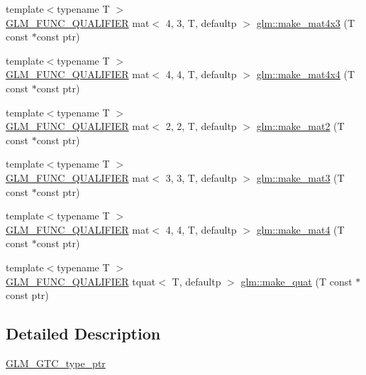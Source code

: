 \begin{DoxyCompactItemize}
\item 
{\footnotesize template$<$typename T $>$ }\\\mbox{\hyperlink{setup_8hpp_a33fdea6f91c5f834105f7415e2a64407}{G\+L\+M\+\_\+\+F\+U\+N\+C\+\_\+\+Q\+U\+A\+L\+I\+F\+I\+ER}} mat$<$ 4, 3, T, defaultp $>$ \mbox{\hyperlink{group__gtc__type__ptr_ga0330bf6640092d7985fac92927bbd42b}{glm\+::make\+\_\+mat4x3}} (T const $\ast$const ptr)
\item 
{\footnotesize template$<$typename T $>$ }\\\mbox{\hyperlink{setup_8hpp_a33fdea6f91c5f834105f7415e2a64407}{G\+L\+M\+\_\+\+F\+U\+N\+C\+\_\+\+Q\+U\+A\+L\+I\+F\+I\+ER}} mat$<$ 4, 4, T, defaultp $>$ \mbox{\hyperlink{group__gtc__type__ptr_ga8f084be30e404844bfbb4a551ac2728c}{glm\+::make\+\_\+mat4x4}} (T const $\ast$const ptr)
\item 
{\footnotesize template$<$typename T $>$ }\\\mbox{\hyperlink{setup_8hpp_a33fdea6f91c5f834105f7415e2a64407}{G\+L\+M\+\_\+\+F\+U\+N\+C\+\_\+\+Q\+U\+A\+L\+I\+F\+I\+ER}} mat$<$ 2, 2, T, defaultp $>$ \mbox{\hyperlink{group__gtc__type__ptr_ga04409e74dc3da251d2501acf5b4b546c}{glm\+::make\+\_\+mat2}} (T const $\ast$const ptr)
\item 
{\footnotesize template$<$typename T $>$ }\\\mbox{\hyperlink{setup_8hpp_a33fdea6f91c5f834105f7415e2a64407}{G\+L\+M\+\_\+\+F\+U\+N\+C\+\_\+\+Q\+U\+A\+L\+I\+F\+I\+ER}} mat$<$ 3, 3, T, defaultp $>$ \mbox{\hyperlink{group__gtc__type__ptr_ga611ee7c4d4cadfc83a8fa8e1d10a170f}{glm\+::make\+\_\+mat3}} (T const $\ast$const ptr)
\item 
{\footnotesize template$<$typename T $>$ }\\\mbox{\hyperlink{setup_8hpp_a33fdea6f91c5f834105f7415e2a64407}{G\+L\+M\+\_\+\+F\+U\+N\+C\+\_\+\+Q\+U\+A\+L\+I\+F\+I\+ER}} mat$<$ 4, 4, T, defaultp $>$ \mbox{\hyperlink{group__gtc__type__ptr_gae7bcedb710d1446c87fd1fc93ed8ee9a}{glm\+::make\+\_\+mat4}} (T const $\ast$const ptr)
\item 
{\footnotesize template$<$typename T $>$ }\\\mbox{\hyperlink{setup_8hpp_a33fdea6f91c5f834105f7415e2a64407}{G\+L\+M\+\_\+\+F\+U\+N\+C\+\_\+\+Q\+U\+A\+L\+I\+F\+I\+ER}} tquat$<$ T, defaultp $>$ \mbox{\hyperlink{group__gtc__type__ptr_gaadafb6600af2633e4c98cc64c72f5269}{glm\+::make\+\_\+quat}} (T const $\ast$const ptr)
\end{DoxyCompactItemize}


\subsection{Detailed Description}
\mbox{\hyperlink{group__gtc__type__ptr}{G\+L\+M\+\_\+\+G\+T\+C\+\_\+type\+\_\+ptr}} 